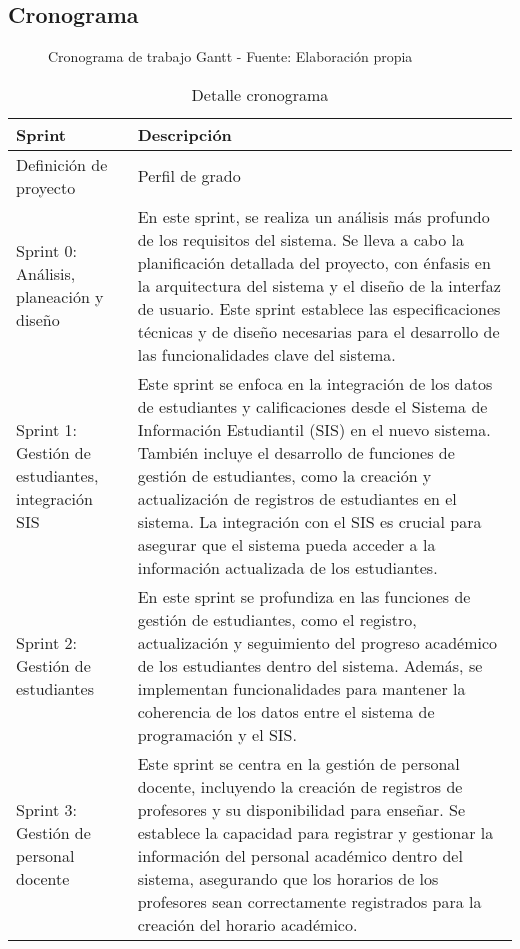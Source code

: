 \subsection{Cronograma}

\begin{figure}[H]
    \centering
    \caption{Cronograma de trabajo Gantt - Fuente: Elaboración propia} \label{fig:chronogram}
\end{figure}

\begin{longtable}{p{3in}|p{3in}}
\caption{Detalle cronograma} \label{tab:chronogram} \\
\hline
\endfirsthead
\hline
\textbf{Sprint} & \textbf{Descripción} \\
\hline
\endhead
\hline
\endfoot

\hline
Definición de proyecto & Perfil de grado \\
\hline

Sprint 0: Análisis, planeación y diseño & 
En este sprint, se realiza un análisis más profundo de los requisitos del sistema.
Se lleva a cabo la planificación detallada del proyecto, con énfasis en la arquitectura del sistema y el diseño de la interfaz de usuario. Este sprint establece las especificaciones técnicas y de diseño necesarias para el desarrollo de las funcionalidades clave del sistema. \\
\hline

Sprint 1: Gestión de estudiantes, integración SIS & 
Este sprint se enfoca en la integración de los datos de estudiantes y calificaciones desde el Sistema de Información Estudiantil (SIS) en el nuevo sistema.
También incluye el desarrollo de funciones de gestión de estudiantes, como la creación y actualización de registros de estudiantes en el sistema. La integración con el SIS es crucial para asegurar que el sistema pueda acceder a la información actualizada de los estudiantes. \\
\hline

Sprint 2: Gestión de estudiantes & 
En este sprint se profundiza en las funciones de gestión de estudiantes, como el registro, actualización y seguimiento del progreso académico de los estudiantes dentro del sistema.
Además, se implementan funcionalidades para mantener la coherencia de los datos entre el sistema de programación y el SIS. \\
\hline

Sprint 3: Gestión de personal docente & 
Este sprint se centra en la gestión de personal docente, incluyendo la creación de registros de profesores y su disponibilidad para enseñar.
Se establece la capacidad para registrar y gestionar la información del personal académico dentro del sistema, asegurando que los horarios de los profesores sean correctamente registrados para la creación del horario académico. \\
\hline


\end{longtable}
